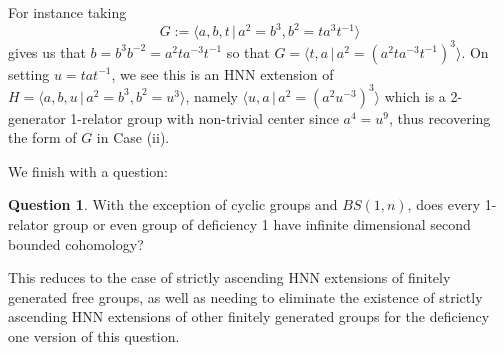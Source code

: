 \documentclass[11pt,reqno]{amsart}
\numberwithin{equation}{section}
\theoremstyle{definition}
\newtheorem{question}[thm]{Question}
\theoremstyle{remark}
\begin{document}
For instance taking
\[G:=\langle a,b,t\,|\,
  a^2=b^3, b^2
  =ta^3t^{-1}\rangle\]
gives us that $b=b^3b^{-2}=a^2ta^{-3}t^{-1}$ so that
$G=\langle t,a\,|\,a^2=(a^2ta^{-3}t^{-1})^3\rangle$.
On setting $u=tat^{-1}$, we see this is an HNN extension
of $H=\langle a,b,u\,|\,a^2=b^3, b^2=u^3\rangle$, namely
$\langle u,a\,|\,a^2=(a^2u^{-3})^3\rangle$ which is a 
2-generator 1-relator group with non-trivial center since $a^4=u^9$,
thus recovering the form of $G$ in Case (ii).

We finish with a question:
\begin{question}
  With the exception of cyclic groups and $BS(1,n)$, does every 1-relator
  group or even group of deficiency 1 have infinite dimensional second bounded
  cohomology?
\end{question}
This reduces to the case of strictly ascending HNN extensions of
finitely generated free groups, as well as needing to eliminate the
existence of strictly ascending HNN extensions of other finitely
generated groups for the deficiency one version of this question.
\end{document}
